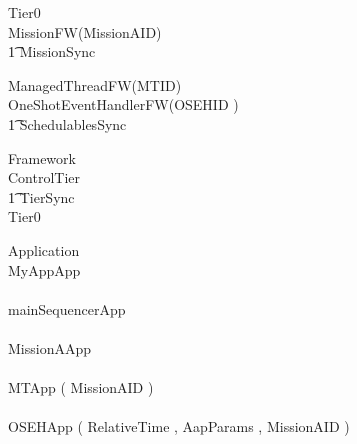 \begin{circus}
\circprocess Tier0 \circdef \\

\circblockopen
	MissionFW(MissionAID)\\
		\t1 	\lpar MissionSync \rpar \\
		\circblockopen



			ManagedThreadFW(MTID)\\









	OneShotEventHandlerFW(OSEHID   )\\




\t1 \lpar SchedulablesSync \rpar\\




		\circblockclose
\circblockclose
\end{circus}
%
%
%
\begin{circus}
\circprocess Framework \circdef \\
\circblockopen
ControlTier \\
\t1 \lpar TierSync \rpar \\
 \circblockopen
Tier0
\circblockclose
\circblockclose
\end{circus}
%
%
\begin{circus}
\circprocess  Application \circdef \\
\circblockopen
MyAppApp\\
\interleave\\
mainSequencerApp\\
\interleave \\
		MissionAApp\\
		\interleave \\
			MTApp ( MissionAID  ) \\
			\interleave \\
			OSEHApp ( RelativeTime ,  AapParams ,  MissionAID  ) \\
			
		
\circblockclose
\end{circus}
